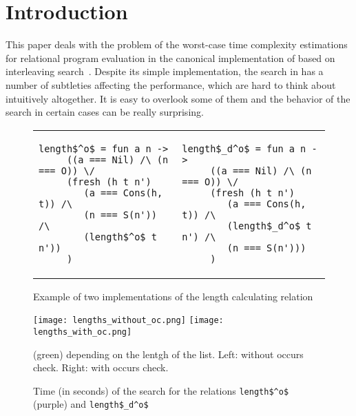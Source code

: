 \section{Introduction}
\label{sec:intro}

This paper deals with the problem of the worst-case time complexity estimations for relational program evaluation in the canonical implementation of \mK based on interleaving search~\cite{TRS}. Despite its simple implementation, the search in \mK has a number of subtleties
affecting the performance, which are hard to think about intuitively altogether. It is easy to overlook some of them and the behavior of the search in certain cases can be really surprising.

\begin{figure}[t]
\begin{tabular}{p{5cm}p{5cm}}
\begin{lstlisting}[basicstyle=\small]
   length$^o$ = fun a n ->
     ((a === Nil) /\ (n === O)) \/
     (fresh (h t n')
        (a === Cons(h, t)) /\
        (n === S(n')) /\
        (length$^o$ t n'))
     )
\end{lstlisting} &
\begin{lstlisting}[basicstyle=\small]
   length$_d^o$ = fun a n ->
     ((a === Nil) /\ (n === O)) \/
     (fresh (h t n')
        (a === Cons(h, t)) /\
        (length$_d^o$ t n') /\
        (n === S(n')))
     )
\end{lstlisting}
\end{tabular}
\caption{Example of two implementations of the length calculating relation}
\label{fig:length_implementations}
\end{figure}

\begin{figure}[t]
    \texttt{[image: lengths\_without\_oc.png]}
    \texttt{[image: lengths\_with\_oc.png]}
  \caption{Time (in seconds) of the search for the relations \lstinline|length$^o$| (purple) and \lstinline|length$_d^o$|} (green) depending on the lentgh of the list.
  Left: without occurs check.
  Right: with occurs check.
  \label{fig:length_plots}
\end{figure}

